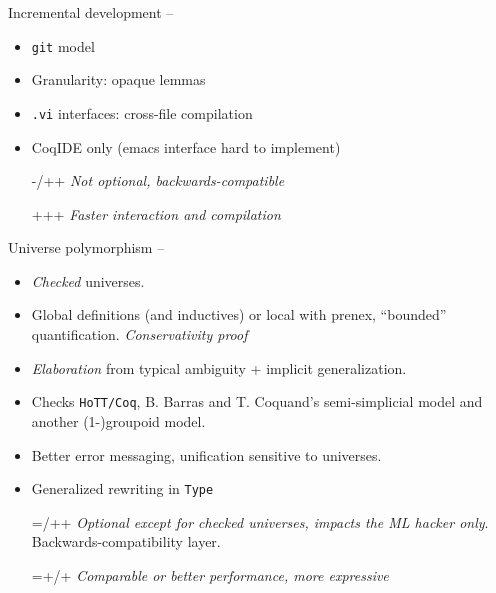 \begin{subsecframe}{Incremental development -- }
  \begin{itemize}
  \item \texttt{git} model
  \item Granularity: opaque lemmas
  \item \texttt{.vi} interfaces: cross-file compilation
  \item CoqIDE only (emacs interface hard to implement)
  \end{itemize}

  \begin{itemize}
  \item[-/++] \emph{Not optional, backwards-compatible}
  \item[+++] \emph{Faster interaction and compilation}
  \end{itemize}
\end{subsecframe}

\begin{subsecframe}{Universe polymorphism -- }
  \begin{itemize}
  \item \emph{Checked} universes.
  \item Global definitions (and inductives) or local with prenex, ``bounded''
    quantification. \emph{Conservativity proof}
  \item \emph{Elaboration} from typical ambiguity + implicit
    generalization.
  \item Checks \texttt{HoTT/Coq}, B. Barras and T. Coquand's semi-simplicial
    model and another (1-)groupoid model.
    \pause
  \item Better error messaging, unification sensitive to universes.
  \item Generalized rewriting in \alert{\texttt{Type}}
  \end{itemize}

  \begin{itemize}
  \item[=/++] \emph{Optional except for checked
      universes, impacts the ML hacker only}. Backwards-compatibility layer.
  \item[=+/+] \emph{Comparable or better performance, more expressive}
  \end{itemize}
  
\end{subsecframe}

